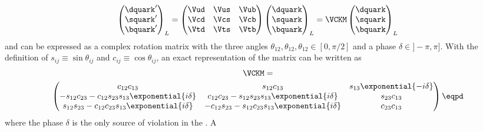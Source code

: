 \begin{equation}
  \begin{pmatrix}
    \dquark^\prime \\
    \squark^\prime \\
    \bquark^\prime \\
  \end{pmatrix}_L
  = 
  \begin{pmatrix}
    \Vud & \Vus & \Vub \\
    \Vcd & \Vcs & \Vcb \\
    \Vtd & \Vts & \Vtb \\
  \end{pmatrix}
  \begin{pmatrix}
    \dquark \\
    \squark \\
    \bquark \\
  \end{pmatrix}_L
  = \VCKM
  \begin{pmatrix}
    \dquark \\
    \squark \\
    \bquark \\
  \end{pmatrix}_L
\end{equation}
%
and can be expressed as a complex rotation matrix with the three angles
$\theta_{12}, \theta_{12}, \theta_{12} \in {[0, \pi/2]}$ and a phase $\delta \in
{]-\pi, \pi]}$. With the definition of $s_{ij} \equiv \sin \theta_{ij}$ and
$c_{ij} \equiv \cos \theta_{ij}$, an exact representation of the \CKM matrix can
be written as
%
\begin{multline}
  \VCKM = \\
  \begin{pmatrix}
    c_{12} c_{13}                                                   & s_{12} c_{13}                                                 & s_{13} \exponential{-i\delta} \\
    -s_{12} c_{23} - c_{12} s_{23} s_{13} \exponential{i\delta}     & c_{12} c_{23} - s_{12} s_{23} s_{13} \exponential{i\delta}    & s_{23} c_{13}                 \\
    s_{12} s_{23} - c_{12} c_{23} s_{13} \exponential{i\delta}      & -c_{12} s_{23} - s_{12} c_{23} s_{13} \exponential{i\delta}   & c_{23} c_{13}                 \\
  \end{pmatrix}\eqpd
\end{multline}
%
where the phase $\delta$ is the only source of \CP violation in the \SM. A
